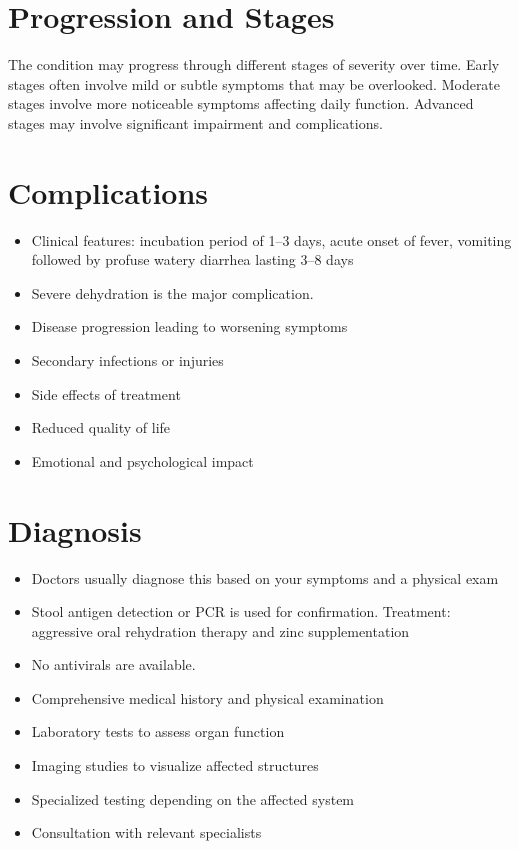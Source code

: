 \section{Progression and Stages}
The condition may progress through different stages of severity over time. Early stages often involve mild or subtle symptoms that may be overlooked. Moderate stages involve more noticeable symptoms affecting daily function. Advanced stages may involve significant impairment and complications.
\section{Complications}
\begin{itemize}[noitemsep]
  \item Clinical features: incubation period of 1--3 days, acute onset of fever, vomiting followed by profuse watery diarrhea lasting 3--8 days
  \item Severe dehydration is the major complication.
  \item Disease progression leading to worsening symptoms
  \item Secondary infections or injuries
  \item Side effects of treatment
  \item Reduced quality of life
  \item Emotional and psychological impact
\end{itemize}
\section{Diagnosis}
\begin{itemize}[noitemsep]
  \item Doctors usually diagnose this based on your symptoms and a physical exam
  \item Stool antigen detection or PCR is used for confirmation. Treatment: aggressive oral rehydration therapy and zinc supplementation
  \item No antivirals are available.
  \item Comprehensive medical history and physical examination
  \item Laboratory tests to assess organ function
  \item Imaging studies to visualize affected structures
  \item Specialized testing depending on the affected system
  \item Consultation with relevant specialists
\end{itemize}

